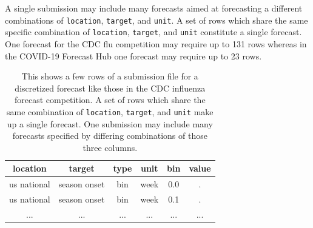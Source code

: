 \documentclass[11pt,notitlepage]{isuthesis}
\begin{document}
A single submission may include many forecasts aimed at forecasting a 
different combinations of \texttt{location}, \texttt{target}, and \texttt{unit}. 
A set of rows which share
the same specific combination of \texttt{location}, \texttt{target}, and 
\texttt{unit} constitute a single forecast. One forecast for the CDC flu
competition may require up to 131 rows whereas in the COVID-19 Forecast Hub one 
forecast may require up to 23 rows.


\begin{table}[h!]
\begin{center}
\begin{minipage}{10cm}
\captionsetup{font=scriptsize}
\centering
 \begin{tabular}{|c|c|c|c|c|c|}
 \hline
    location & target & type & unit & bin & value  \\ \hline
    us national & season onset & bin & week & 0.0 & . \\
    us national & season onset & bin & week & 0.1 & . \\
    ... & ... & ... & ... & ... & ... \\
 \hline
 \end{tabular}
 \caption[Influenza competition submission example]{This shows a few rows of a 
 submission file
 for a discretized forecast like those in the CDC influenza forecast 
 competition. A set of rows which share the same combination of 
 \texttt{location}, \texttt{target}, and \texttt{unit} make up a
 single forecast. One submission may include many forecasts specified by 
 differing combinations of those three columns.}
 \label{table:dstan}
 \end{minipage}
 \end{center}
\end{table}
\end{document}
